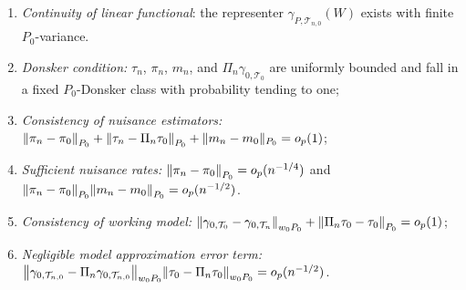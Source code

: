 \documentclass[11pt]{article}
\theoremstyle{definition}
\begin{document}
\begin{enumerate}[label=E\arabic*), ref={E\arabic*}, resume=condE]
    \item \textit{Continuity of linear functional}: the representer $\gamma_{P, \mathcal{T}_{n,0}}(W)$ exists with finite $P_0$-variance. \label{cond::CATE::boundedFunc}
    
    \item \textit{Donsker condition:} \(\tau_n\), \(\pi_n\), \(m_n\), and \(\Pi_n \gamma_{0,\mathcal{T}_0}\) are uniformly bounded and fall in a fixed \(P_0\)-Donsker class with probability tending to one;
     \label{cond::CATE::DonskerMLE}
     \item \textit{Consistency of nuisance estimators:} \(\norm{\pi_n - \pi_0}_{P_0} + \norm{\tau_n - \Pi_n \tau_0}_{P_0} + \|m_n - m_0\|_{P_0} = o_p(1)\);
     \label{cond::CATE::consistentNuis}
     \item \textit{Sufficient nuisance rates:} \(\norm{\pi_n - \pi_0}_{P_0} = o_p(n^{-1/4})\) and \(\norm{\pi_n - \pi_0}_{P_0}\norm{m_n - m_0}_{P_0} = o_p(n^{-1/2})\).
     \label{cond::CATE::DRterm}
     \item \textit{Consistency of working model:} \(\norm{\gamma_{0,\mathcal{T}_0} -  \gamma_{0,\mathcal{T}_n}}_{w_0P_0} + \norm{\Pi_n \tau_0 - \tau_0}_{P_0} = o_p(1)\);
     \label{cond::CATE::consistentWorking}
     \item \textit{Negligible model approximation error term:} \(\norm{\gamma_{0,\mathcal{T}_{n,0}} - \Pi_n \gamma_{0,\mathcal{T}_{n,0}}}_{w_0P_0}\norm{\tau_0 - \Pi_n \tau_0}_{w_0P_0} = o_p(n^{-1/2})\).
     \label{cond::CATE::critBias}
\end{enumerate}
\end{document}
